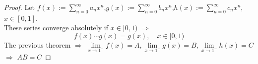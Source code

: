 \begin{proof}
    Let  $ f(x):=\sum\limits_{n=0 }^{\infty} a_nx^n $,\quad$g(x):=\sum\limits_{n=0 }^{\infty} b_nx^n  $,\quad$ h(x):=\sum\limits_{n=0 }^{\infty } c_nx^n $, $ x\in[0,1] $.\\
    These series converge absolutely if  $ x\in[0,1) $  $ \Rightarrow $
    \[f(x)\cdots g(x)=g(x),\quad x\in[0,1)\]
    The previous theorem  $ \Rightarrow  $  $ \lim\limits_{x\to 1^-}f(x)=A,\lim\limits_{x\to 1^-}g(x)=B,\lim\limits_{x\to 1^-}h(x)=C       $\\ $ \Rightarrow $  $ AB=C $      
\end{proof}